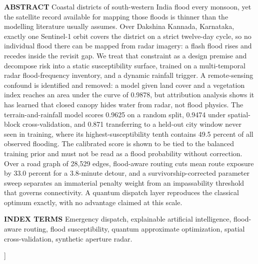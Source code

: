 \documentclass[10pt,twocolumn]{article}
\begin{document}
\begin{@twocolumnfalse}
\begin{minipage}{\dimexpr\textwidth-0.958in\relax}
{\fontsize{10}{12}\selectfont
{\helv\bfseries\color{accessblue}ABSTRACT }Coastal districts of south-western India flood every monsoon, yet the satellite record available for mapping those floods is thinner than the modelling literature usually assumes. Over Dakshina Kannada, Karnataka, exactly one Sentinel-1 orbit covers the district on a strict twelve-day cycle, so no individual flood there can be mapped from radar imagery: a flash flood rises and recedes inside the revisit gap. We treat that constraint as a design premise and decompose risk into a static susceptibility surface, trained on a multi-temporal radar flood-frequency inventory, and a dynamic rainfall trigger. A remote-sensing confound is identified and removed: a model given land cover and a vegetation index reaches an area under the curve of 0.9878, but attribution analysis shows it has learned that closed canopy hides water from radar, not flood physics. The terrain-and-rainfall model scores 0.9625 on a random split, 0.9474 under spatial-block cross-validation, and 0.871 transferring to a held-out city window never seen in training, where its highest-susceptibility tenth contains 49.5 percent of all observed flooding. The calibrated score is shown to be tied to the balanced training prior and must not be read as a flood probability without correction. Over a road graph of 28,529 edges, flood-aware routing cuts mean route exposure by 33.0 percent for a 3.8-minute detour, and a survivorship-corrected parameter sweep separates an immaterial penalty weight from an impassability threshold that governs connectivity. A quantum dispatch layer reproduces the classical optimum exactly, with no advantage claimed at this scale.\par}

\vspace{9pt}

{\fontsize{10}{12}\selectfont\raggedright
{\helv\bfseries\color{accessblue}INDEX TERMS }Emergency dispatch, explainable artificial intelligence, flood-aware routing, flood susceptibility, quantum approximate optimization, spatial cross-validation, synthetic aperture radar.\par}
\end{minipage}

\vspace{16pt}
\end{@twocolumnfalse}
]
\end{document}
